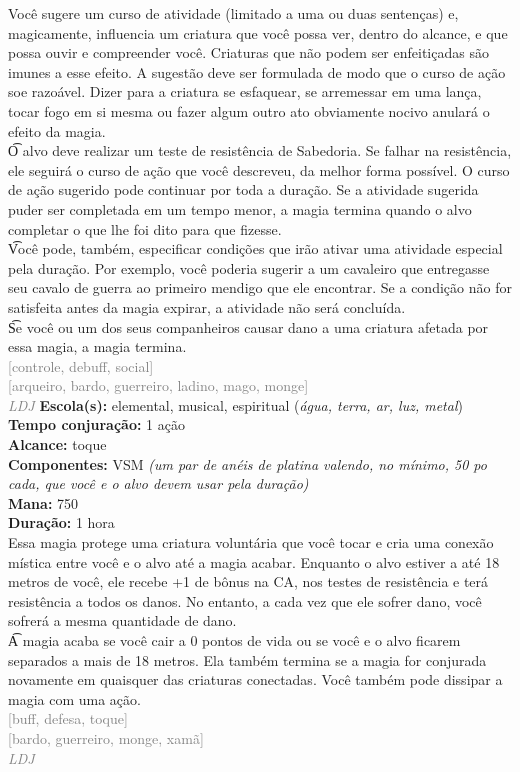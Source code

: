 \documentclass{RPG_Adventure}[2021/10/20]
\begin{document}
{\normalsize Você sugere um curso de atividade (limitado a uma ou duas sentenças) e, magicamente, influencia um criatura que você possa ver, dentro do alcance, e que possa ouvir e compreender você. Criaturas que não podem ser enfeitiçadas são imunes a esse efeito. A sugestão deve ser formulada de modo que o curso de ação soe razoável. Dizer para a criatura se esfaquear, se arremessar em uma lança, tocar fogo em si mesma ou fazer algum outro ato obviamente nocivo anulará o efeito da magia.\\\t O alvo deve realizar um teste de resistência de Sabedoria. Se falhar na resistência, ele seguirá o curso de ação que você descreveu, da melhor forma possível. O curso de ação sugerido pode continuar por toda a duração. Se a atividade sugerida puder ser completada em um tempo menor, a magia termina quando o alvo completar o que lhe foi dito para que fizesse.\\\t Você pode, também, especificar condições que irão ativar uma atividade especial pela duração. Por exemplo, você poderia sugerir a um cavaleiro que entregasse seu cavalo de guerra ao primeiro mendigo que ele encontrar. Se a condição não for satisfeita antes da magia expirar, a atividade não será concluída.\\\t Se você ou um dos seus companheiros causar dano a uma criatura afetada por essa magia, a magia termina.\\}
{\scriptsize \textcolor{gray}{[controle, debuff, social]\\}}
{\scriptsize \textcolor{gray}{[arqueiro, bardo, guerreiro, ladino, mago, monge]\\}}
{\tiny \textcolor{gray}{\textit{LDJ}}}\jump{}
{\small \t \textbf{Escola(s):} elemental, musical, espiritual (\textit{água, terra, ar, luz, metal})\\\t \textbf{Tempo conjuração:} 1 ação\\\t \textbf{Alcance:} toque\\\t \textbf{Componentes:} VSM \textit{(um par de anéis de platina valendo, no mínimo, 50 po cada, que você e o alvo devem usar pela duração)}\\\t \textbf{Mana:} 750\\\t \textbf{Duração:} 1 hora\\}
{\normalsize Essa magia protege uma criatura voluntária que você tocar e cria uma conexão mística entre você e o alvo até a magia acabar. Enquanto o alvo estiver a até 18 metros de você, ele recebe +1 de bônus na CA, nos testes de resistência e terá resistência a todos os danos. No entanto, a cada vez que ele sofrer dano, você sofrerá a mesma quantidade de dano.\\\t A magia acaba se você cair a 0 pontos de vida ou se você e o alvo ficarem separados a mais de 18 metros. Ela também termina se a magia for conjurada novamente em quaisquer das criaturas conectadas. Você também pode dissipar a magia com uma ação.\\}
{\scriptsize \textcolor{gray}{[buff, defesa, toque]\\}}
{\scriptsize \textcolor{gray}{[bardo, guerreiro, monge, xamã]\\}}
{\tiny \textcolor{gray}{\textit{LDJ}}}\jump

\end{document}
